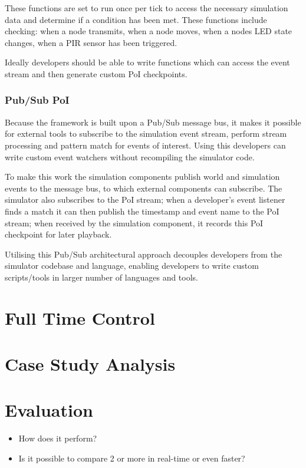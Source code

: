 These functions are set to run once per tick to access the necessary simulation data and determine if a condition has been met. These functions include checking: when a node transmits, when a node moves, when a nodes LED state changes, when a PIR sensor has been triggered.

Ideally developers should be able to write functions which can access the event stream and then generate custom PoI checkpoints.

\subsubsection{Pub/Sub PoI} %
\label{sub:pub_sub_poi}
Because the framework is built upon a Pub/Sub message bus, it makes it possible for external tools to subscribe to the simulation event stream, perform stream processing and pattern match for events of interest. Using this developers can write custom event watchers without recompiling the simulator code.

To make this work the simulation components publish world and simulation events to the message bus, to which external components can subscribe. The simulator also subscribes to the PoI stream; when a developer's event listener finds a match it can then publish the timestamp and event name to the PoI stream; when received by the simulation component, it records this PoI checkpoint for later playback.

Utilising this Pub/Sub architectural approach decouples developers from the simulator codebase and language, enabling developers to write custom scripts/tools in larger number of languages and tools.

\section{Full Time Control} %
\label{sec:full_time_control}


\section{Case Study Analysis}
\label{sec:Case Study Analysis}

\section{Evaluation}
\label{sec:Evaluation}
\begin{itemize}
  \item How does it perform?
  \item Is it possible to compare 2 or more in real-time or even faster?
\end{itemize}

